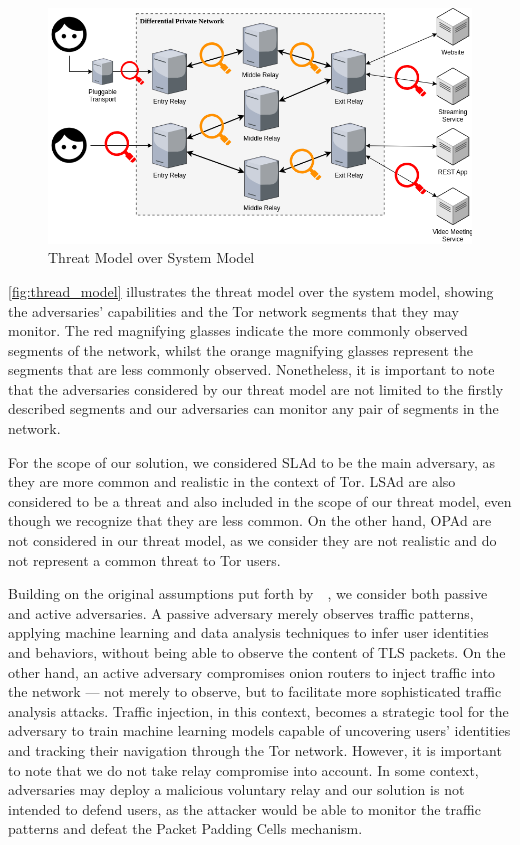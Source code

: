 \begin{figure}[!h]
  \centering
  \includegraphics[width=\textwidth]{Chapters/Figures/Threat_Model.png}
  \caption{Threat Model over System Model}\label{fig:thread_model}
\end{figure}

\autoref{fig:thread_model} illustrates the threat model over the system model, showing the adversaries' capabilities and the Tor network segments that they may monitor. The red magnifying glasses indicate the more commonly observed segments of the network, whilst the orange magnifying glasses represent the segments that are less commonly observed. Nonetheless, it is important to note that the adversaries considered by our threat model are not limited to the firstly described segments and our adversaries can monitor any pair of segments in the network.  

For the scope of our solution, we considered SLAd to be the main adversary, as they are more common and realistic in the context of Tor. LSAd are also considered to be a threat and also included in the scope of our threat model, even though we recognize that they are less common. On the other hand, OPAd are not considered in our threat model, as we consider they are not realistic and do not represent a common threat to Tor users.

Building on the original assumptions put forth by~\citeauthor{dingledine2004tor}~\cite{dingledine2004tor}, we consider both passive and active adversaries. A passive adversary merely observes traffic patterns, applying machine learning and data analysis techniques to infer user identities and behaviors, without being able to observe the content of TLS packets. On the other hand, an active adversary compromises onion routers to inject traffic into the network — not merely to observe, but to facilitate more sophisticated traffic analysis attacks. Traffic injection, in this context, becomes a strategic tool for the adversary to train machine learning models capable of uncovering users' identities and tracking their navigation through the Tor network. However, it is important to note that we do not take relay compromise into account. In some context, adversaries may deploy a malicious voluntary relay and our solution is not intended to defend users, as the attacker would be able to monitor the traffic patterns and defeat the Packet Padding Cells mechanism. 


